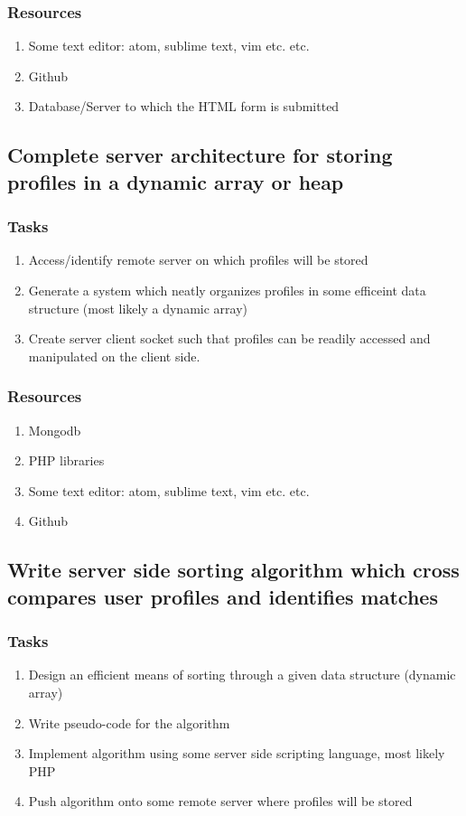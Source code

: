\documentclass[12pt]{article}
\begin{document}
	  	\subsubsection{\bf Resources}
				\begin{enumerate}
 					\item Some text editor: atom, sublime text, vim etc. etc.
 					\item Github
			 		\item Database/Server to which the HTML form is submitted
				\end{enumerate}

 		\subsection{\bf Complete server architecture for storing profiles in a dynamic array or heap}
			\subsubsection{\bf Tasks}
				\begin{enumerate}
					\item	Access/identify remote server on which profiles will be stored
					\item	Generate a system which neatly organizes profiles in some efficeint data structure (most likely a dynamic array)
					\item Create server client socket such that profiles can be readily accessed and manipulated on the client side.
				\end{enumerate}
	  	\subsubsection{\bf Resources}
				\begin{enumerate}
					\item Mongodb
					\item PHP libraries
 					\item Some text editor: atom, sublime text, vim etc. etc.
 					\item Github
				\end{enumerate}

		\subsection{\bf Write server side sorting algorithm which cross compares user profiles and identifies matches}
			\subsubsection{\bf Tasks}
				\begin{enumerate}
					\item	Design an efficient means of sorting through a given data structure (dynamic array)
					\item	Write pseudo-code for the algorithm
					\item Implement algorithm using some server side scripting language, most likely PHP
					\item Push algorithm onto some remote server where profiles will be stored
				\end{enumerate}
\end{document}
